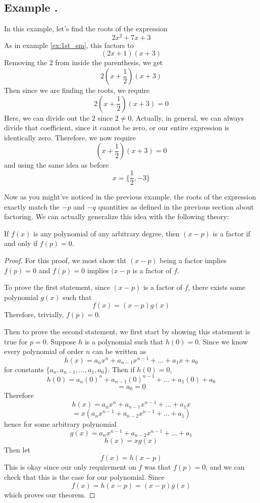 \documentclass[11pt]{article}
\numberwithin{lemma}{section}
\numberwithin{equation}{section}
\numberwithin{define}{section}
\numberwithin{prop}{section}
\numberwithin{figure}{section}
\numberwithin{theorem}{section}
\numberwithin{cor}{section}
\newcounter{ex}[section]
\newenvironment{ex}[0]{

	\refstepcounter{ex}
    \subsection*{Example \theex .}
    }
    {
    \par
    }
\numberwithin{ex}{section}
\begin{document}
\begin{ex}
	In this example, let's find the roots of the expression 
	$$2x^2+7x+3$$
	As in example \eqref{ex:1st_sm}, this factors to
	$$(2x+1)(x+3)$$
	Removing the $2$ from inside the parenthesis, we get
	$$2(x+\frac{1}{2})(x+3)$$
	Then since we are finding the roots, we require
	$$2(x+\frac{1}{2})(x+3)=0$$
	Here, we can divide out the $2$ since $2\neq0$. Actually, in general, we can always divide that coefficient, 
	since it cannot be zero, or our entire expression is identically zero.
	Therefore, we now require
	$$(x+\frac{1}{2})(x+3)=0$$
	and using the same idea as before
	$$x=\{\frac{1}{2},-3\}$$
\end{ex}

Now as you might've noticed in the previous example, the roots of the expression exactly match the $-p$ and $-q$ quantities as defined in the previous section about factoring. We can actually generalize this idea with the following theory:

\begin{theorem}
	If $f(x)$ is any polynomial of any arbitrary degree, then $(x-p)$ is a factor if and only if \footnotemark $f(p)=0$.
	\label{thm:zero}
\end{theorem}
\begin{proof}
	For this proof, we most show tht $(x-p)$ being a factor implies $f(p)=0$ and $f(p)=0$ implies
	$(x-p$ is a factor of $f$.
	
	To prove the first statement, since $(x-p)$ is a factor of $f$, there exists some polynomial $g(x)$ such that
	$$f(x)=(x-p)g(x)$$
	Therefore, trivially, $f(p)=0$.
	
	Then to prove the second statement, we first start by showing this statement is true for $p=0$.
	Suppose $h$ is a polynomial such that $h(0)=0$.
	Since we know every polynomial of order $n$ can be written as
	$$h(x)=a_nx^n+a_{n-1}x^{n-1}+...+a_1x+a_0$$
	for constants $\{a_n,a_{n-1},...,a_1,a_0\}$.
	Then if $h(0)=0$,
	$$h(0)=a_n(0)^n+a_{n-1}(0)^{n-1}+...+a_1(0)+a_0$$
	$$=a_0=0$$
	Therefore
	$$h(x)=a_nx^n+a_{n-1}x^{n-1}+...+a_1x$$
	$$=x(a_nx^{n-1}+a_{n-2}x^{n-1}+...+a_1)$$
	hence for some arbitrary polynomial
	$$g(x)=a_nx^{n-1}+a_{n-2}x^{n-1}+...+a_1$$
	$$h(x)=xg(x)$$
	Then let
	$$f(x)=h(x-p)$$
	This is okay since our only requirement on $f$ was that $f(p)=0$, and we can check that this is the case for our polynomial.
	Since
	$$f(x)=h(x-p)=(x-p)g(x)$$
	which proves our theorem.
\end{proof}
\end{document}
